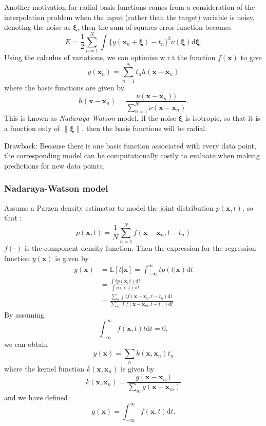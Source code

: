\documentclass[a4paper]{book}
\newcommand{\mbf}{\mathbf}
\newcommand{\ud}{\mathrm{d}}
\newcommand{\xx}{\mbf x}
\newcommand{\Exp}{\mathbb{E}}
\begin{document}
Another motivation for radial basis functions comes from a consideration of the interpolation problem when the input (rather than the target) variable is noisy, denoting the noise as $\bm \xi$, then the sum-of-squares error function becomes
\begin{equation}\label{}
  E=\frac12\sum_{n=1}^{N}\int \{y(\xx_n+\bm\xi)-t_n\}^2\nu(\bm\xi)\ud\bm\xi.
\end{equation}
Using the calculus of variations, we can optimize w.r.t the function $f(\xx)$ to give
\begin{equation}\label{}
  y(\xx_n)=\sum_{n=1}^{N}t_nh(\xx-\xx_n)
\end{equation}
where the basis functions are given by
\begin{equation}\label{}
  h(\xx-\xx_n) = \frac{\nu(\xx-\xx_n))}{\sum_{n=1}^{N}\nu(\xx-\xx_n)}.
\end{equation}
This is known as \textit{Nadaraya-Watson} model. If the noise $\bm \xi$ is isotropic, so that it is a function only of $\|\bm\xi\|$, then the basis functions will be radial.

Drawback: Because there is one basis function associated with every data point, the corresponding model can be computationally costly to evaluate when making predictions for new data points.
\subsubsection*{ Nadaraya-Watson model}
Assume a Parzen density estimator to model the joint distribution $p(\xx, t) $, so that :
\begin{equation}
p(\xx,t) = \frac1N\sum_{n=1}^{N}f(\xx-\xx_n,t-t_n)
\end{equation}
$f(\cdot)$ is the component density function. Then the expression for the regression function $y(\xx)$ is given by
\begin{align}\label{}
  y(\xx) & =\Exp[t|\xx] =\int_{-\infty}^\infty tp(t|\xx)\ud t \\
   & =\frac{\int tp(\xx,t)\ud t}{\int p(\xx,t)\ud t} \\
   & = \frac{\sum_n \int tf(\xx-\xx_n,t-t_n)\ud t}{\sum_m \int f(\xx-\xx_m,t-t_m)\ud t}
\end{align}
By assuming 
\begin{equation}\label{}
  \int_{-\infty}^{\infty}f(\xx,t)t\ud t = 0,
\end{equation}
we can obtain 
\begin{equation}
y(\xx) = \sum_nk(\xx,\xx_n)t_n
\end{equation}
where the kernel function $k(\xx,\xx_n)$ is given by 
\begin{equation}\label{}
  k(\xx,\xx_n) = \frac{g(\xx-\xx_n)}{\sum_m g(\xx-\xx_m)}
\end{equation}
and we have defined 
\begin{equation}\label{}
  g(\xx) = \int_{-\infty}^{\infty}f(\xx,t)\ud t.
\end{equation}
\end{document}
